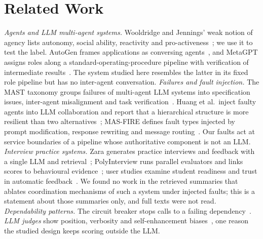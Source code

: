 \documentclass[runningheads]{llncs}
\begin{document}
\section{Related Work}
\emph{Agents and LLM multi-agent systems.} Wooldridge and Jennings' weak notion of agency lists autonomy, social ability, reactivity and pro-activeness~\cite{wj95}; we use it to test the label. AutoGen frames applications as conversing agents~\cite{autogen}, and MetaGPT assigns roles along a standard-operating-procedure pipeline with verification of intermediate results~\cite{metagpt}. The system studied here resembles the latter in its fixed role pipeline but has no inter-agent conversation. \emph{Failures and fault injection.} The MAST taxonomy groups failures of multi-agent LLM systems into specification issues, inter-agent misalignment and task verification~\cite{mast}. Huang et al.\ inject faulty agents into LLM collaboration and report that a hierarchical structure is more resilient than two alternatives~\cite{resil}; MAS-FIRE defines fault types injected by prompt modification, response rewriting and message routing~\cite{masfire}. Our faults act at service boundaries of a pipeline whose authoritative component is not an LLM. \emph{Interview practice systems.} Zara generates practice interviews and feedback with a single LLM and retrieval~\cite{zara}; PolyInterview runs parallel evaluators and links scores to behavioural evidence~\cite{polyint}; user studies examine student readiness and trust in automatic feedback~\cite{virt,chase}. We found no work in the retrieved summaries that ablates coordination mechanisms of such a system under injected faults; this is a statement about those summaries only, and full texts were not read. \emph{Dependability patterns.} The circuit breaker stops calls to a failing dependency~\cite{nygard}. \emph{LLM judges} show position, verbosity and self-enhancement biases~\cite{judge}, one reason the studied design keeps scoring outside the LLM.
\end{document}
